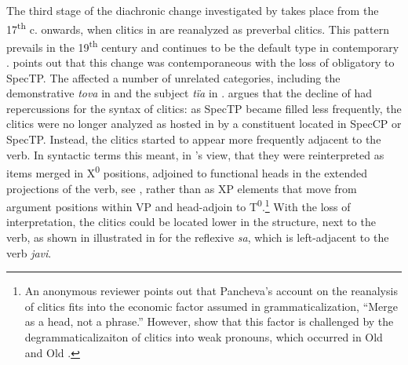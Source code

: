 \documentclass[output=paper,modfonts,newtxmath,hidelinks]{langscibook}
\begin{document}
The third stage of the diachronic change investigated by \citeauthor{pancheva2005} takes place from the 17\textsuperscript{th} c. onwards, when  clitics in  are reanalyzed as preverbal clitics. This pattern prevails in the 19\textsuperscript{th} century and continues to be the default  type in contemporary . \citeauthor{pancheva2005} points out that this change was contemporaneous with the loss of obligatory  to SpecTP. The  affected a number of unrelated categories, including the demonstrative \textit{tova} in  and the subject \textit{tïa} in . \citeauthor{pancheva2005} argues that the decline of  had repercussions for the syntax of clitics: as SpecTP became filled less frequently, the clitics were no longer analyzed as hosted in  by a constituent located in SpecCP or SpecTP. Instead, the clitics started to appear more frequently adjacent to the verb. In syntactic terms this meant, in \citeauthor{pancheva2005}’s view, that they were reinterpreted as items merged in X\textsuperscript{0} positions, adjoined to functional heads in the extended projections of the verb, see , rather than as XP elements that move from argument positions within VP and head-adjoin to T\textsuperscript{0}.\footnote{\label{11:fn2}An anonymous reviewer points out that Pancheva’s account on the reanalysis of clitics fits into the economic factor assumed in grammaticalization, “Merge as a head, not a phrase.” However, \citet{jung-migdalski2015} show that this factor is challenged by the degrammaticalizaiton of  clitics into weak pronouns, which occurred in Old  and Old .} With the loss of  interpretation, the clitics could be located lower in the structure, next to the verb, as shown in illustrated in  for the reflexive  \textit{sa}, which is left-adjacent to the verb \textit{javi}. 

\ea \label{11:ex5}
	 \label{11:ex5a}
	 \label{11:ex5b}
	\z
\z
\end{document}
